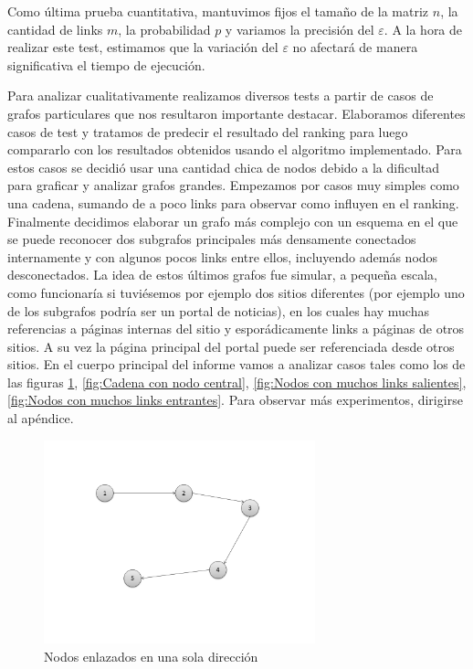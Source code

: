 \par
Como \'ultima prueba cuantitativa, mantuvimos fijos el tama\~no de la matriz $n$, la cantidad de links $m$, la probabilidad $p$ y variamos la precisi\'on del $\varepsilon$.
A la hora de realizar este test, estimamos que la variaci\'on del $\varepsilon$ no afectar\'a de manera significativa el tiempo de ejecuci\'on.

\par
Para analizar cualitativamente realizamos diversos tests a partir de casos de grafos particulares que nos resultaron importante destacar.
Elaboramos diferentes casos de test y tratamos de predecir el resultado del ranking para luego compararlo con los resultados obtenidos usando el algoritmo implementado. Para estos casos se decidió usar una cantidad chica de nodos debido a la dificultad para graficar y analizar grafos grandes.
Empezamos por casos muy simples como una cadena, sumando de a poco links para observar como influyen en el ranking.
Finalmente decidimos elaborar un grafo m\'as complejo con un esquema en el que se puede reconocer dos subgrafos principales m\'as densamente conectados internamente y con algunos pocos links entre ellos, incluyendo además nodos desconectados. La idea de estos últimos grafos fue simular, a pequeña escala, como funcionaría si tuviésemos por ejemplo dos sitios diferentes (por ejemplo uno de los subgrafos podría ser un portal de noticias), en los cuales hay muchas referencias a páginas internas del sitio y espor\'adicamente links a páginas de otros sitios. A su vez la página principal del portal puede ser referenciada desde otros sitios. En el cuerpo principal del informe vamos a analizar casos tales como los de las figuras \ref{fig:Cadena simple}, \ref{fig:Cadena con nodo central}, \ref{fig:Nodos con muchos links salientes}, \ref{fig:Nodos con muchos links entrantes}. Para observar m\'as experimentos, dirigirse al ap\'endice.

\begin{figure}[H]
	\centering
	\includegraphics[width=0.7\textwidth]{img/cadena4.png}
	\caption{Nodos enlazados en una sola dirección}
	\label{fig:Cadena simple}
\end{figure}



